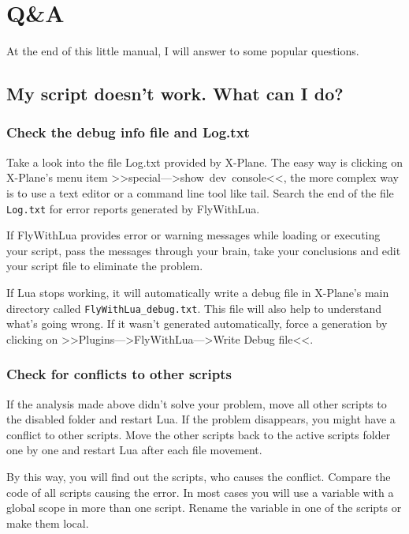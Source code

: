 \documentclass[11pt,parskip=half,a4paper]{scrartcl}
\begin{document}
\newpage
\section{Q\&A}

At the end of this little manual, I will answer to some popular questions.

\subsection{My script doesn't work. What can I do?}

\subsubsection{Check the debug info file and Log.txt}

Take a look into the file Log.txt provided by X-Plane. The easy way is clicking on X-Plane's menu item >>special--->show~dev~console<<, the more complex way is to use a text editor or a command line tool like tail. Search the end of the file \verb|Log.txt| for error reports generated by FlyWithLua.

If FlyWithLua provides error or warning messages while loading or executing your script, pass the messages through your brain, take your conclusions and edit your script file to eliminate the problem.

If Lua stops working, it will automatically write a debug file in X-Plane's main directory called \verb|FlyWithLua_debug.txt|. This file will also help to understand what's going wrong. If it wasn't generated automatically, force a generation by clicking on >>Plugins--->FlyWithLua--->Write Debug file<<.

\subsubsection{Check for conflicts to other scripts}

If the analysis made above didn't solve your problem, move all other scripts to the disabled folder and restart Lua. If the problem disappears, you might have a conflict to other scripts. Move the other scripts back to the active scripts folder one by one and restart Lua after each file movement. 

By this way, you will find out the scripts, who causes the conflict. Compare the code of all scripts causing the error. In most cases you will use a variable with a global scope in more than one script. Rename the variable in one of the scripts or make them local.
\end{document}
